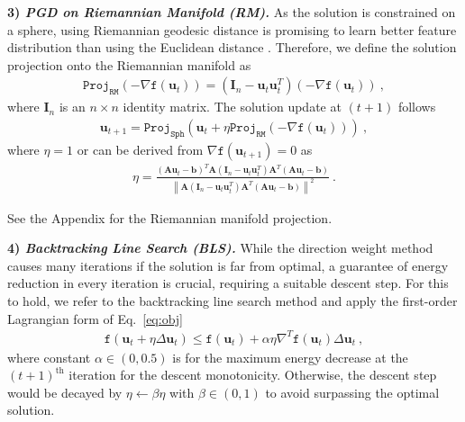 \documentclass{article}
\newcommand{\mb}[1]{\mathbf{#1}}
\newcommand\norm[1]{\left\lVert#1\right\rVert}
\theoremstyle{plain}
\theoremstyle{definition}
\theoremstyle{remark}
\begin{document}
\textbf{3) \textit{PGD on Riemannian Manifold (RM).}}
%
As the solution is constrained on a sphere, using Riemannian geodesic distance is promising to learn better feature distribution than using the Euclidean distance \citep{rieman-geodesic-brain,rieman-geodesic-domain}.
Therefore, we define the solution projection onto the Riemannian manifold \citep{boumal2020intromanifolds} as
%
\begin{equation}
\begin{aligned}
\label{eq:rie}
\texttt{Proj}_{\texttt{RM}}\left( -\nabla \texttt{f}(\mb{u}_t) \right) = \left( \mb{I}_n - \mb{u}_t \mb{u}^T_t \right) \left( -\nabla \texttt{f}(\mb{u}_t) \right)\ ,
\end{aligned}
\end{equation}
where $\mb{I}_n$ is an $n \times n$ identity matrix.
The solution update at $(t+1)$ follows
%
\begin{equation}
\begin{aligned}
\label{eq:rie_solution_update}
\mb{u}_{t+1} = \texttt{Proj}_{\texttt{Sph}}\left( \mb{u}_t + \eta \texttt{Proj}_{\texttt{RM}} \left( -\nabla \texttt{f}(\mb{u}_t) \right) \right)\ ,
\end{aligned}
\end{equation}
where $\eta=1$ or can be derived from $\nabla \texttt{f}(\mb{u}_{t+1}) = 0$ as
%
\begin{equation}
\begin{aligned}
\label{eq:rie_eta}
\eta = \frac{\left( \mb{A}\mb{u}_t - \mb{b} \right)^T \mb{A} \left( \mb{I}_n - \mb{u}_t \mb{u}^T_t \right) \mb{A}^T (\mb{A} \mb{u}_t - \mb{b})}{\norm{ \mb{A}(\mb{I}_n - \mb{u}_t \mb{u}^T_t) \mb{A}^T (\mb{A} \mb{u}_t - \mb{b}) }^2}\ .
\end{aligned}
\end{equation}

See the Appendix for the Riemannian manifold projection.

\textbf{4) \textit{Backtracking Line Search (BLS).}}
While the direction weight method causes many iterations if the solution is far from optimal, a guarantee of energy reduction in every iteration is crucial, requiring a suitable descent step.
%
For this to hold, we refer to the backtracking line search method \citep{boyd2004convex} and apply the first-order Lagrangian form of Eq.~\eqref{eq:obj}
%
\begin{equation}
\begin{aligned}
\label{eq:backtrack}
\texttt{f}(\mb{u}_t+\eta \Delta \mb{u}_t) \leq \texttt{f}(\mb{u}_t) + \alpha \eta \nabla^T \texttt{f}(\mb{u}_t) \Delta \mb{u}_t\ ,
\end{aligned}
\end{equation}
where constant $\alpha \in (0, 0.5)$ is for the maximum energy decrease at the $(t+1)^{\text{th}}$ iteration for the descent monotonicity.
Otherwise, the descent step would be decayed by $\eta \leftarrow \beta \eta$ with $\beta \in (0, 1)$ to avoid surpassing the optimal solution.
\end{document}
